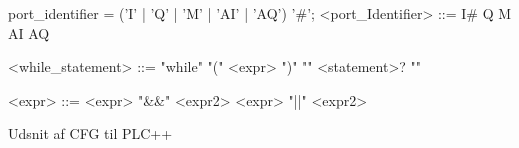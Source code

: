 \begin{Grammar}
 \begin{grammar}
 port_identifier = ('I' | 'Q' | 'M' | 'AI' | 'AQ') '#';
 <port\_Identifier> ::= I#
 \alt Q
 \alt M
 \alt AI
 \alt AQ
 
 <while\_statement> ::= "while" "(" <expr> ")" "{" <statement>? "}"
 
 <expr> ::= <expr> "&&" <expr2>
 \alt <expr> "||" <expr2>
  
  
 \end{grammar}
 \caption{Udsnit af CFG til PLC++}\label{gra:udsnit}
\end{Grammar}
